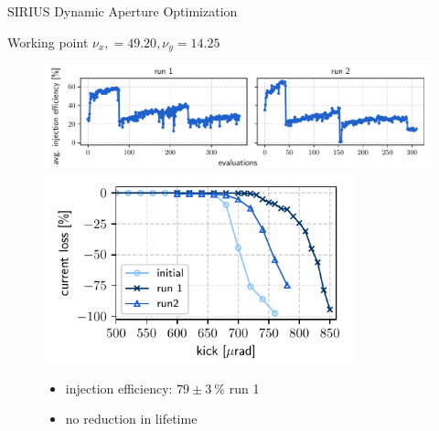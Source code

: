 \documentclass[aspectratio=169]{beamer}
\begin{document}
\begin{frame}{SIRIUS Dynamic Aperture Optimization}
    \begin{minipage}{0.55\textwidth}
        Working point $\nu_x, = 49.20, \nu_y = 14.25$
        \begin{figure}
            \centering
            \includegraphics[width=\textwidth]{newtunes_history.pdf}
            \includegraphics[width = 0.8\textwidth]{WEPL087_f3.pdf}
            \begin{itemize}
                \item injection efficiency: $79\pm3~\%$ run 1
                \item no reduction in lifetime
            \end{itemize}
        \end{figure}
    \end{minipage}
    \hfill
    \begin{minipage}{0.44\textwidth}
        \begin{figure}
            \centering

\end{figure}
\end{minipage}
\end{frame}
\end{document}
